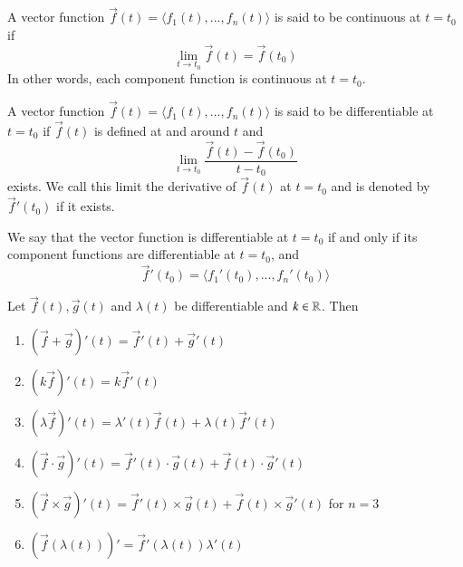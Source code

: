\documentclass[12pt, a4paper, oneside, openright, titlepage]{book}
\begin{document}
\begin{appendices}
    \begin{defn}[Continuity]
        A vector function $\vec{f}(t) = \langle f_1(t),...,f_n(t)\rangle$ is said to be continuous at $t = t_0$ if \begin{equation}
            \lim\limits_{t\rightarrow t_0}\vec{f}(t) = \vec{f}(t_0)
        \end{equation}
        In other words, each component function is continuous at $t = t_0$.
    \end{defn}

    \begin{defn}[Differentiability]
        A vector function $\vec{f}(t) = \langle f_1(t),...,f_n(t)\rangle$ is said to be differentiable at $t = t_0$ if $\vec{f}(t)$ is defined at and around $t$ and \begin{equation}
            \lim\limits_{t\rightarrow t_0}\frac{\vec{f}(t) - \vec{f}(t_0)}{t - t_0}
        \end{equation}
        exists. We call this limit the derivative of $\vec{f}(t)$ at $t = t_0$ and is denoted by $\vec{f}'(t_0)$ if it exists.
    \end{defn}

    \begin{thm}
        We say that the vector function is differentiable at $t = t_0$ if and only if its component functions are differentiable at $t = t_0$, and \begin{equation}
            \vec{f}'(t_0) = \langle f_1'(t_0),...,f_n'(t_0)\rangle
        \end{equation}
    \end{thm}



    \begin{rmk}
        Let $\vec{f}(t), \vec{g}(t)$ and $\lambda(t)$ be differentiable and $k \in \mathbb R$. Then \begin{enumerate}
            \item $(\vec{f}+\vec{g})'(t) = \vec{f}'(t) + \vec{g}'(t)$
            \item $(k\vec{f})'(t) = k\vec{f}'(t)$
            \item $(\lambda\vec{f})'(t) = \lambda'(t)\vec{f}(t) + \lambda(t)\vec{f}'(t)$
            \item $(\vec{f}\cdot\vec{g})'(t) = \vec{f}'(t)\cdot \vec{g}(t) + \vec{f}(t)\cdot \vec{g}'(t)$
            \item $(\vec{f}\times \vec{g})'(t) = \vec{f}'(t)\times \vec{g}(t) + \vec{f}(t)\times \vec{g}'(t)$ for $n = 3$
            \item $(\vec{f}(\lambda(t)))' = \vec{f}'(\lambda(t))\lambda'(t)$
        \end{enumerate}
    \end{rmk}



\end{appendices}
\end{document}
